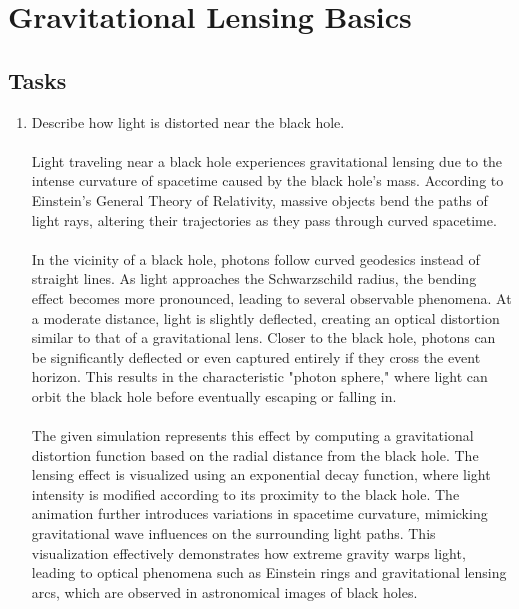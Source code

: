 \documentclass {article}
\begin{document}
\newpage
\section{Gravitational Lensing Basics}

\subsection{Tasks}
\begin{enumerate}
    \item Describe how light is distorted near the black hole.
    \paragraph{}
Light traveling near a black hole experiences gravitational lensing due to the intense curvature of spacetime caused by the black hole's mass. According to Einstein's General Theory of Relativity, massive objects bend the paths of light rays, altering their trajectories as they pass through curved spacetime. 

\paragraph{}
In the vicinity of a black hole, photons follow curved geodesics instead of straight lines. As light approaches the Schwarzschild radius, the bending effect becomes more pronounced, leading to several observable phenomena. At a moderate distance, light is slightly deflected, creating an optical distortion similar to that of a gravitational lens. Closer to the black hole, photons can be significantly deflected or even captured entirely if they cross the event horizon. This results in the characteristic "photon sphere," where light can orbit the black hole before eventually escaping or falling in.

\paragraph{}
The given simulation represents this effect by computing a gravitational distortion function based on the radial distance from the black hole. The lensing effect is visualized using an exponential decay function, where light intensity is modified according to its proximity to the black hole. The animation further introduces variations in spacetime curvature, mimicking gravitational wave influences on the surrounding light paths. This visualization effectively demonstrates how extreme gravity warps light, leading to optical phenomena such as Einstein rings and gravitational lensing arcs, which are observed in astronomical images of black holes.

\end{enumerate}
\newpage
\end{document}
